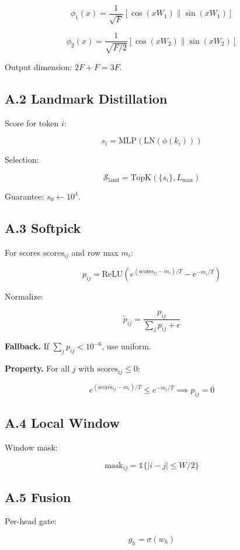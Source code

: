 \[
\phi_1(x) = \frac{1}{\sqrt{F}} [\cos(xW_1) \| \sin(xW_1)]
\tag{A.3}
\]

\[
\phi_2(x) = \frac{1}{\sqrt{F/2}} [\cos(xW_2) \| \sin(xW_2)]
\tag{A.4}
\]

Output dimension: $2F + F = 3F$.

\subsection{A.2 Landmark Distillation}

Score for token $i$:

\[
s_i = \text{MLP}(\text{LN}(\phi(k_i)))
\tag{A.5}
\]

Selection:

\[
\mathcal{S}_\text{land} = \text{TopK}(\{s_i\}, L_\text{max})
\tag{A.6}
\]

Guarantee: $s_0 \leftarrow 10^4$.

\subsection{A.3 Softpick}

For scores $\text{scores}_{ij}$ and row max $m_i$:

\[
p_{ij} = \text{ReLU}\!\left(e^{(\text{scores}_{ij} - m_i)/T} - e^{-m_i/T}\right)
\tag{A.7}
\]

Normalize:

\[
\tilde{p}_{ij} = \frac{p_{ij}}{\sum_j p_{ij} + \epsilon}
\tag{A.8}
\]

\textbf{Fallback.} If $\sum_j p_{ij} < 10^{-6}$, use uniform.

\textbf{Property.} For all $j$ with $\text{scores}_{ij} \leq 0$:

\[
e^{(\text{scores}_{ij} - m_i)/T} \leq e^{-m_i/T} \implies p_{ij} = 0
\tag{A.9}
\]

\subsection{A.4 Local Window}

Window mask:

\[
\text{mask}_{ij} = \mathbb{1}\{|i - j| \leq W/2\}
\tag{A.10}
\]

\subsection{A.5 Fusion}

Per-head gate:

\[
g_h = \sigma(w_h)
\tag{A.11}
\]

